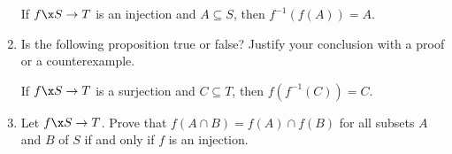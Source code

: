 \begin{enumerate}
If $f\x  S \to T$ is an injection and $A \subseteq S$, then 
$f^{-1} \!\left( f ( A ) \right) = A$.

\item Is the following proposition true or false?  Justify your conclusion with a proof or a counterexample. \label{exer:sec91-13}

If $f\x  S \to T$ is a surjection and $C \subseteq T$, then 
$f \!\left( f^{-1} ( C ) \right) = C$.

\item Let $f\x S \to T$.  Prove that 
$f ( A \cap B ) = f ( A ) \cap f ( B )$ for all subsets $A$ and $B$ of $S$ if and only if $f$ is an injection.

\hbreak
\end{enumerate}


\endinput
